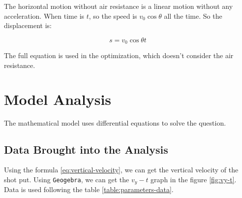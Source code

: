 \documentclass{article}
\begin{document}
The horizontal motion without air resistance is a linear motion without any acceleration. When time is $t$, so the speed is $v_0\cos\theta$ all the time. So the displacement is:

\begin{equation}
    s=v_0\cos\theta t
\end{equation}

The full equation is used in the optimization, which doesn't consider the air resistance.

\section{Model Analysis}

\label{section:model-analysis}

The mathematical model uses differential equations to solve the question.

\subsection{Data Brought into the Analysis}

\label{subsection:data-brought}

Using the formula \ref{eq:vertical-velocity}, we can get the vertical velocity of the shot put. Using \texttt{Geogebra}, we can get the $v_y-t$ graph in the figure \ref{fig:vy-t}. Data is used following the table \ref{table:parameters-data}.
\end{document}
